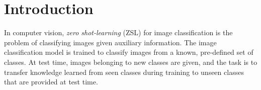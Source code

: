 \documentclass[11pt,a4paper]{article}
\newcommand\gal[1]{\textcolor{bright}{\textbf{GAL:} #1 }}
\begin{document}
\begin{abstract}
\end{abstract}




\section{Introduction}

In computer vision, {\em zero shot-learning} (ZSL) for image classification is the problem of classifying images given auxiliary information. The image classification model is trained to classify images from a known, pre-defined set of classes. At test time, images belonging to new classes are given, and the task is to transfer knowledge learned from seen classes during training to unseen classes that are provided at test time. 
\end{document}
